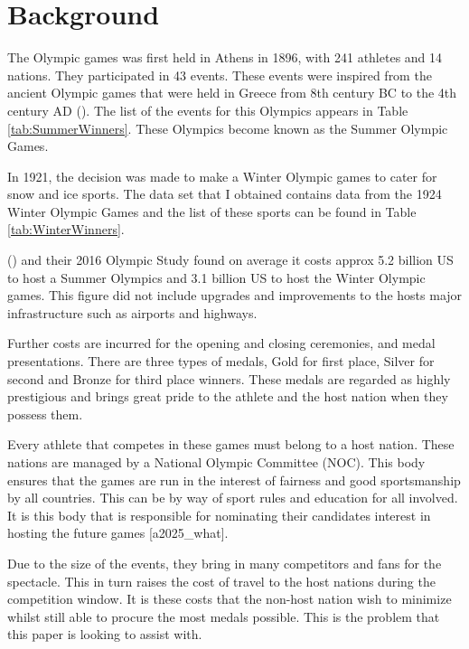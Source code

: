 \documentclass[
]{article}
\begin{document}
\newpage

\section*{Background}\label{background}

The Olympic games was first held in Athens in 1896, with 241 athletes and 14 nations. They participated in 43 events. These events were inspired from the ancient Olympic games that were held in Greece from 8th century BC to the 4th century AD (). The list of the events for this Olympics appears in Table \ref{tab:SummerWinners}. These Olympics become known as the Summer Olympic Games.

In 1921, the decision was made to make a Winter Olympic games to cater for snow and ice sports. The data set that I obtained contains data from the 1924 Winter Olympic Games and the list of these sports can be found in Table \ref{tab:WinterWinners}.

() and their 2016 Olympic Study found on average it costs approx 5.2 billion US to host a Summer Olympics and 3.1 billion US to host the Winter Olympic games. This figure did not include upgrades and improvements to the hosts major infrastructure such as airports and highways.

Further costs are incurred for the opening and closing ceremonies, and medal presentations. There are three types of medals, Gold for first place, Silver for second and Bronze for third place winners. These medals are regarded as highly prestigious and brings great pride to the athlete and the host nation when they possess them.

Every athlete that competes in these games must belong to a host nation. These nations are managed by a National Olympic Committee (NOC). This body ensures that the games are run in the interest of fairness and good sportsmanship by all countries. This can be by way of sport rules and education for all involved. It is this body that is responsible for nominating their candidates interest in hosting the future games {[}a2025\_what{]}.

Due to the size of the events, they bring in many competitors and fans for the spectacle. This in turn raises the cost of travel to the host nations during the competition window. It is these costs that the non-host nation wish to minimize whilst still able to procure the most medals possible. This is the problem that this paper is looking to assist with.
\end{document}
